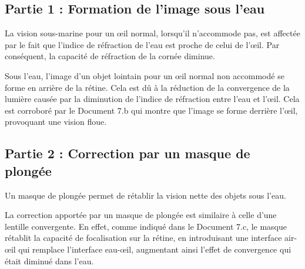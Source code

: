 \documentclass[answers]{exam}
\begin{document}
\begin{solution}

\subsection*{Partie 1 : Formation de l'image sous l'eau}

La vision sous-marine pour un œil normal, lorsqu’il n’accommode pas, est affectée par le fait que l’indice de réfraction de l’eau est proche de celui de l'œil. Par conséquent, la capacité de réfraction de la cornée diminue.

\begin{compactitem}
  \item Sous l'eau, l'image d'un objet lointain pour un œil normal non accommodé se forme en arrière de la rétine. Cela est dû à la réduction de la convergence de la lumière causée par la diminution de l’indice de réfraction entre l'eau et l'œil. Cela est corroboré par le Document 7.b qui montre que l'image se forme derrière l'œil, provoquant une vision floue.
\end{compactitem}

\subsection*{Partie 2 : Correction par un masque de plongée}

Un masque de plongée permet de rétablir la vision nette des objets sous l’eau. 

\begin{compactitem}
  \item La correction apportée par un masque de plongée est similaire à celle d'une lentille convergente. En effet, comme indiqué dans le Document 7.c, le masque rétablit la capacité de focalisation sur la rétine, en introduisant une interface air-œil qui remplace l'interface eau-œil, augmentant ainsi l'effet de convergence qui était diminué dans l'eau.
\end{compactitem}

\end{solution}
\end{document}
